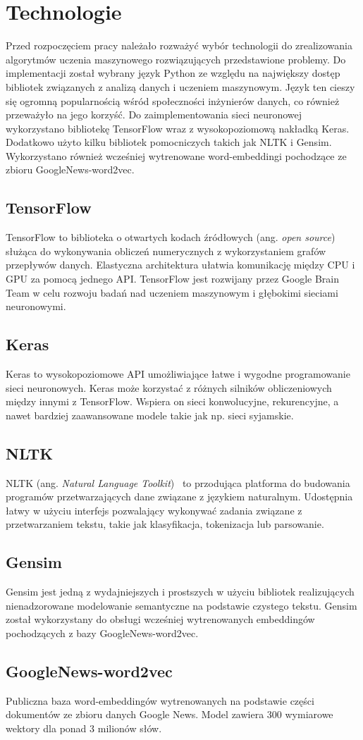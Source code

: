 \chapter{Technologie}
Przed rozpoczęciem pracy należało rozważyć wybór technologii do zrealizowania algorytmów uczenia maszynowego rozwiązujących przedstawione problemy. Do implementacji został wybrany język Python ze względu na największy dostęp bibliotek związanych z analizą danych i uczeniem maszynowym. Język ten cieszy się ogromną popularnością wśród społeczności inżynierów danych, co również przeważyło na jego korzyść. Do zaimplementowania sieci neuronowej wykorzystano bibliotekę TensorFlow wraz z wysokopoziomową nakładką Keras. Dodatkowo użyto kilku bibliotek pomocniczych takich jak NLTK i Gensim. Wykorzystano również wcześniej wytrenowane word-embeddingi pochodzące ze zbioru GoogleNews-word2vec.

\section{TensorFlow}
TensorFlow \cite{tensorflow2015-whitepaper} to biblioteka o otwartych kodach źródłowych (ang. \textit{open source}) służąca do wykonywania obliczeń numerycznych z wykorzystaniem grafów przepływów danych. Elastyczna architektura ułatwia komunikację między CPU i GPU za pomocą jednego API. TensorFlow jest rozwijany przez Google Brain Team w celu rozwoju badań nad uczeniem maszynowym i głębokimi sieciami neuronowymi.

\section{Keras}
Keras \cite{keras} to wysokopoziomowe API umożliwiające łatwe i wygodne programowanie sieci neuronowych. Keras może korzystać z różnych silników obliczeniowych między innymi z TensorFlow. Wspiera on sieci konwolucyjne, rekurencyjne, a nawet bardziej zaawansowane modele takie jak np. sieci syjamskie. 

\section{NLTK}
NLTK (ang. \textit{Natural Language Toolkit})~\cite{nltk} to przodująca platforma do budowania programów przetwarzających dane związane z językiem naturalnym. Udostępnia łatwy w użyciu interfejs pozwalający wykonywać zadania związane z przetwarzaniem tekstu, takie jak klasyfikacja, tokenizacja lub parsowanie.

\section{Gensim}
Gensim \cite{rehurek_lrec} jest jedną z wydajniejszych i prostszych w użyciu bibliotek realizujących nienadzorowane modelowanie semantyczne na podstawie czystego tekstu. Gensim został wykorzystany do obsługi wcześniej wytrenowanych embeddingów pochodzących z bazy GoogleNews-word2vec. 

\section{GoogleNews-word2vec}
Publiczna baza word-embeddingów wytrenowanych na podstawie części dokumentów ze zbioru danych Google News. Model zawiera 300 wymiarowe wektory dla ponad 3 milionów słów.
